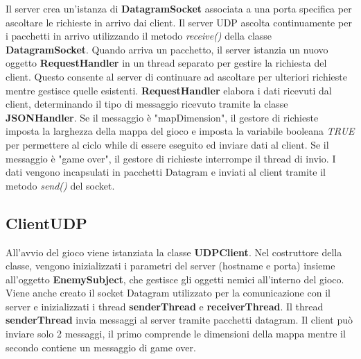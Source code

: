 \documentclass{article}
\begin{document}
Il server crea un'istanza di \textbf{DatagramSocket} associata a una porta specifica per ascoltare le richieste in arrivo dai client.
Il server UDP ascolta continuamente per i pacchetti in arrivo utilizzando il metodo \textit{receive() }della classe \textbf{DatagramSocket}. Quando arriva un pacchetto, il server istanzia un nuovo oggetto \textbf{RequestHandler} in un thread separato per gestire la richiesta del client. Questo consente al server di continuare ad ascoltare per ulteriori richieste mentre gestisce quelle esistenti.
\textbf{RequestHandler} elabora i dati ricevuti dal client, determinando il tipo di messaggio ricevuto tramite la classe \textbf{JSONHandler}. Se il messaggio è "mapDimension", il gestore di richieste imposta la larghezza della mappa del gioco e imposta la variabile booleana \textit{TRUE} per permettere al ciclo while di essere eseguito ed inviare dati al client. Se il messaggio è "game over", il gestore di richieste interrompe il thread di invio.
I dati vengono incapsulati in pacchetti Datagram e inviati al client tramite il metodo \textit{send()} del socket.

\subsection{ClientUDP}

All'avvio del gioco viene istanziata la classe \textbf{UDPClient}.
Nel costruttore della classe, vengono inizializzati i parametri del server (hostname e porta) insieme all'oggetto \textbf{EnemySubject}, che gestisce gli oggetti nemici all'interno del gioco. Viene anche creato il socket Datagram utilizzato per la comunicazione con il server e inizializzati i thread \textbf{senderThread} e \textbf{receiverThread}.
Il thread \textbf{senderThread} invia messaggi al server tramite pacchetti datagram.
Il client può inviare solo 2 messaggi, il primo comprende le dimensioni della mappa mentre il secondo contiene un messaggio di game over.


\pagebreak

\end{document}
